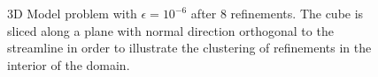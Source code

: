 \documentclass[final,leqno]{siamltex}
\begin{document}
\begin{figure}[!h]
\centering
\caption{3D Model problem with $\epsilon = 10^{-6}$ after 8 refinements.  The cube is sliced along a plane with normal direction orthogonal to the streamline in order to illustrate the clustering of refinements in the interior of the domain.}
\label{fig:3D1e6}
\end{figure}
\end{document}
